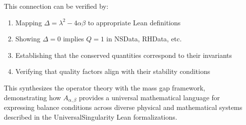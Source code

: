 \documentclass[11pt]{article}
\begin{document}
This connection can be verified by:
\begin{enumerate}
\item Mapping $\Delta = \lambda^2 - 4\alpha\beta$ to appropriate Lean definitions
\item Showing $\Delta = 0$ implies $Q = 1$ in NSData, RHData, etc.
\item Establishing that the conserved quantities correspond to their invariants
\item Verifying that quality factors align with their stability conditions
\end{enumerate}

This synthesizes the operator theory with the mass gap framework, demonstrating how $A_{\alpha,\beta}$ provides a universal mathematical language for expressing balance conditions across diverse physical and mathematical systems described in the UniversalSingularity Lean formalizations.
\end{document}
